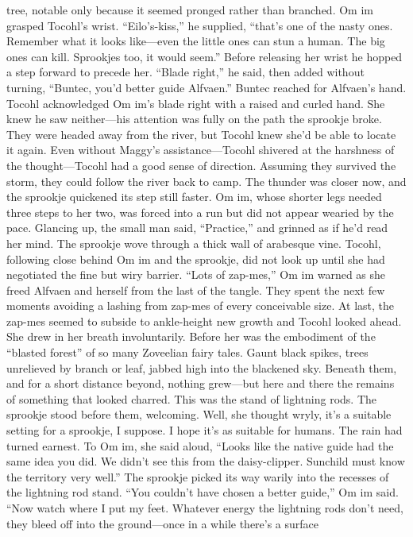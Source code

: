 \documentclass[9pt]{article}
\begin{document}
tree, notable only because it seemed pronged rather than branched.
Om im grasped Tocohl’s wrist. “Eilo’s-kiss,” he supplied, “that’s one of the nasty ones. Remember
what it looks like—even the little ones can stun a human. The big ones can kill. Sprookjes too, it would
seem.” Before releasing her wrist he hopped a step forward to precede her. “Blade right,” he said, then
added without turning, “Buntec, you’d better guide Alfvaen.”
Buntec reached for Alfvaen’s hand. Tocohl acknowledged Om im’s blade right with a raised and
curled hand. She knew he saw neither—his attention was fully on the path the sprookje broke.
They were headed away from the river, but Tocohl knew she’d be able to locate it again. Even
without Maggy’s assistance—Tocohl shivered at the harshness of the thought—Tocohl had a good sense
of direction. Assuming they survived the storm, they could follow the river back to camp.
The thunder was closer now, and the sprookje quickened its step still faster. Om im, whose shorter
legs needed three steps to her two, was forced into a run but did not appear wearied by the pace.
Glancing up, the small man said, “Practice,” and grinned as if he’d read her mind.
The sprookje wove through a thick wall of arabesque vine. Tocohl, following close behind Om im
and the sprookje, did not look up until she had negotiated the fine but wiry barrier. “Lots of zap-mes,”
Om im warned as she freed Alfvaen and herself from the last of the tangle. They spent the next few
moments avoiding a lashing from zap-mes of every conceivable size.
At last, the zap-mes seemed to subside to ankle-height new growth and Tocohl looked ahead. She
drew in her breath involuntarily. Before her was the embodiment of the “blasted forest” of so many
Zoveelian fairy tales.
Gaunt black spikes, trees unrelieved by branch or leaf, jabbed high into the blackened sky. Beneath
them, and for a short distance beyond, nothing grew—but here and there the remains of something that
looked charred. This was the stand of lightning rods. The sprookje stood before them, welcoming.
Well, she thought wryly, it’s a suitable setting for a sprookje, I suppose. I hope it’s as suitable for
humans. The rain had turned earnest.
To Om im, she said aloud, “Looks like the native guide had the same idea you did. We didn’t see
this from the daisy-clipper. Sunchild must know the territory very well.”
The sprookje picked its way warily into the recesses of the lightning rod stand.
“You couldn’t have chosen a better guide,” Om im said. “Now watch where I put my feet. Whatever
energy the lightning rods don’t need, they bleed off into the ground—once in a while there’s a surface
\end{document}
